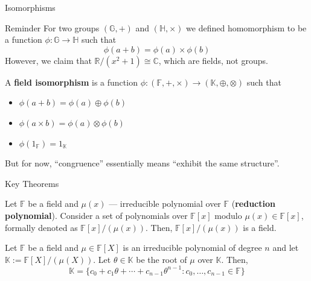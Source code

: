 \documentclass{beamer}
\begin{document}
    \begin{frame}{Isomorphisms}
        \begin{block}{Reminder}
            For two groups $(\mathbb{G},+)$ and $(\mathbb{H},\times)$ we defined homomorphism to be a function $\phi: \mathbb{G} \to \mathbb{H}$ such that
            \begin{equation*}
                \phi(a+b) = \phi(a) \times \phi(b)
            \end{equation*}
            \pause However, we claim that $\mathbb{R}/(x^2+1) \cong \mathbb{C}$, which are fields, not groups.\pause
        \end{block}

        \begin{definition}
            A \textbf{field isomorphism} is a function $\phi: (\mathbb{F},+,\times) \to (\mathbb{K},\oplus,\otimes)$ such that
            \begin{itemize}
                \item $\phi(a+b) = \phi(a) \oplus \phi(b)$
                \item $\phi(a \times b) = \phi(a) \otimes \phi(b)$
                \item $\phi(1_{\mathbb{F}}) = 1_{\mathbb{K}}$
            \end{itemize}

            \pause But for now, ``congruence'' essentially means ``exhibit the same structure''. 
        \end{definition}
    \end{frame}

    \begin{frame}{Key Theorems}

        \begin{theorem}
            Let $\mathbb{F}$ be a field and $\mu(x)$ --- irreducible polynomial over $\mathbb{F}$ (\textbf{reduction polynomial}). Consider a set of polynomials over $\mathbb{F}[x]$ modulo $\mu(x) \in \mathbb{F}[x]$, formally denoted as $\mathbb{F}[x]/(\mu(x))$. Then, $\mathbb{F}[x]/(\mu(x))$ is a field.\pause
        \end{theorem}

        \begin{theorem}
            Let $\mathbb{F}$ be a field and $\mu \in \mathbb{F}[X]$ is an irreducible polynomial of degree $n$ and let $\mathbb{K} := \mathbb{F}[X]/(\mu(X))$. Let $\theta \in \mathbb{K}$ be the root of $\mu$ over $\mathbb{K}$. Then,
            \begin{equation*}
                \mathbb{K} = \{c_0+c_1\theta+\cdots+c_{n-1}\theta^{n-1}: c_0,\dots,c_{n-1} \in \mathbb{F}\}
            \end{equation*}
        \end{theorem}
    \end{frame}
\end{document}
